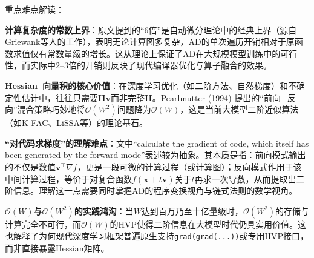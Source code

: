 \documentclass{article}
\begin{document}
{\color{blue}
重点难点解读：

\textbf{计算复杂度的常数上界}：原文提到的``6倍''是自动微分理论中的经典上界（源自Griewank等人的工作），表明无论计算图多复杂，AD的单次遍历开销相对于原函数求值仅有常数量级的增长。这从理论上保证了AD在大规模模型训练中的可行性，而实际中2--3倍的开销则反映了现代编译器优化与算子融合的效果。
    
\textbf{Hessian--向量积的核心价值}：在深度学习优化（如二阶方法、自然梯度）和不确定性估计中，往往只需要$\mathbf{H}\mathbf{v}$而非完整$\mathbf{H}$。Pearlmutter (1994) 提出的``前向+反向''混合策略巧妙地将$\mathcal{O}(W^2)$问题降为$\mathcal{O}(W)$，这是当前大模型二阶近似算法（如K-FAC、LiSSA等）的理论基石。
    
\textbf{``对代码求梯度''的理解难点}：文中``calculate the gradient of code, which itself has been generated by the forward mode''表述较为抽象。其本质是指：前向模式输出的不仅是数值$\mathbf{v}^\top \nabla f$，更是一段可微的计算过程（或计算图）；反向模式作用于该中间计算过程，等价于对复合函数$f(\mathbf{x} + t\mathbf{v})$关于$t$再求一次导数，从而提取出二阶信息。理解这一点需要同时掌握AD的程序变换视角与链式法则的数学视角。
    
\textbf{$\mathcal{O}(W)$与$\mathcal{O}(W^2)$的实践鸿沟}：当$W$达到百万乃至十亿量级时，$\mathcal{O}(W^2)$的存储与计算完全不可行，而$\mathcal{O}(W)$的HVP使得二阶信息在大模型时代仍具实用价值。这也解释了为何现代深度学习框架普遍原生支持\texttt{grad(grad(...))}或专用HVP接口，而非直接暴露Hessian矩阵。

}
\end{document}
